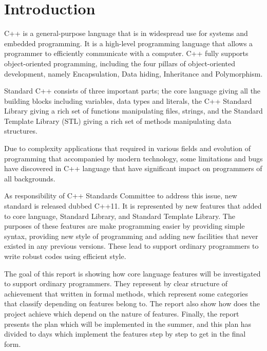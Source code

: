 \documentclass[11pt]{report}
\begin{document}
\section{Introduction}  
\label{section: intorduction}

C++ is a general-purpose language that is in widespread use for systems and embedded programming. It is a high-level programming language that \linebreak allows a programmer to efficiently communicate with a computer. C++ fully \linebreak supports object-oriented programming, including the four pillars of \linebreak object-oriented development, namely Encapsulation, Data hiding, Inheritance and Polymorphism.

Standard C++ consists of three important parts; the core language giving all the building blocks including variables, data types and literals, the C++ Standard Library giving a rich set of functions manipulating files, strings, and the Standard Template Library (STL) giving a rich set of methods manipulating data structures.

Due to complexity applications  that required in various fields and evolution of programming that  accompanied by modern technology, some limitations and bugs have discovered in C++ language that have significant impact on \linebreak programmers of all backgrounds.

As responsibility of C++ Standards Committee to address this issue, new standard is released dubbed C++11. It is represented by new features that added to core language, Standard  Library, and Standard Template Library. The purposes of these features are make programming easier by providing simple syntax, providing new style of programming and adding new facilities that never existed in any previous versions. These lead to support ordinary programmers to write robust codes using efficient style.

The goal of this report is showing how core language features will be \linebreak investigated to support ordinary  programmers. They represent by clear \linebreak structure of achievement that written in formal methods, which represent some categories that  classify depending on features belong to. The report also show how does the project achieve  which depend on the nature of features. Finally, the report presents the plan which will be implemented in the summer, and this plan has divided to days  which implement the features step by step to get in the final form.
\end{document}
